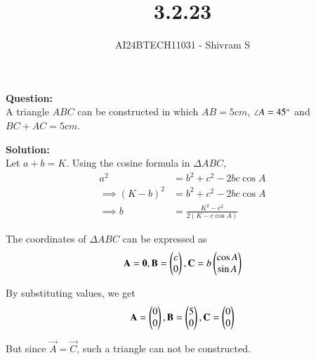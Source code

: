 \documentclass[journal]{IEEEtran}
\begin{document}

\vspace{3cm}

\title{3.2.23}
\author{AI24BTECH11031 - Shivram S
}
{\let\newpage\relax\maketitle}

\renewcommand{\thefigure}{\theenumi}
\renewcommand{\thetable}{\theenumi}
\setlength{\intextsep}{10pt} %


\renewcommand{\thetable}{\theenumi}


\textbf{Question: }\\
A triangle $ABC$ can be constructed in which $AB = 5cm$, $\angle A = 45 \degree$ and $BC + AC = 5cm$.

\textbf{Solution: } \\
Let $a + b = K$. Using the cosine formula in $\Delta ABC$, 
\begin{align}
    a^2 &= b^2 + c^2 - 2bc \cos A \\
    \implies (K - b)^2 &= b^2 + c^2 - 2bc \cos A \\
    \implies b &= \frac{K^2 - c^2}{2(K - c \cos A)}
\end{align}

The coordinates of $\Delta ABC$ can be expressed as
\begin{align}
    \mathbf{A} = \mathbf{0}, \mathbf{B} = \begin{pmatrix}c \\ 0\end{pmatrix}, \mathbf{C} = b \begin{pmatrix}\cos A \\ \sin A\end{pmatrix}
\end{align}

By substituting values, we get
\begin{align}
    \mathbf{A} = \begin{pmatrix}0 \\ 0\end{pmatrix}, \mathbf{B} = \begin{pmatrix}5 \\ 0\end{pmatrix}, \mathbf{C} = \begin{pmatrix}0 \\ 0\end{pmatrix}
\end{align}

But since $\vec{A} = \vec{C}$, such a triangle can not be constructed.
\end{document}
